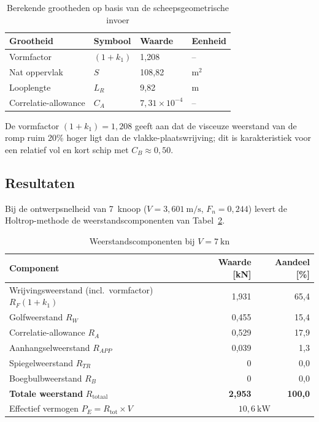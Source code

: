 \begin{table}[H]
\centering
\caption{Berekende grootheden op basis van de scheepsgeometrische invoer
         \cite{spreadsheet_holtrop}}
\label{tab:holtrop_derived}
\begin{tabular}{llll}
\toprule
Grootheid & Symbool & Waarde & Eenheid \\
\midrule
Vormfactor          & $(1+k_1)$    & 1{,}208                & --   \\
Nat oppervlak       & $S$          & 108{,}82               & m$^2$\\
Looplengte          & $L_R$        &   9{,}82               & m    \\
Correlatie-allowance& $C_A$        & $7{,}31 \times 10^{-4}$& --   \\
\bottomrule
\end{tabular}
\end{table}

De vormfactor $(1+k_1) = 1{,}208$ geeft aan dat de visceuze weerstand van de romp
ruim 20\% hoger ligt dan de vlakke-plaatswrijving; dit is karakteristiek voor een
relatief vol en kort schip met $C_B \approx 0{,}50$.

\subsection{Resultaten}
\label{subsec:holtrop-resultaten}

Bij de ontwerpsnelheid van 7~knoop ($V = 3{,}601\ \mathrm{m/s}$, $F_n = 0{,}244$)
levert de Holtrop-methode de weerstandscomponenten van
Tabel~\ref{tab:holtrop_results_7kn}.

\begin{table}[H]
\centering
\caption{Weerstandscomponenten bij $V = 7\ \mathrm{kn}$}
\label{tab:holtrop_results_7kn}
\begin{tabular}{lrr}
\toprule
Component & Waarde [kN] & Aandeel [\%] \\
\midrule
Wrijvingsweerstand (incl.\ vormfactor) $R_F(1+k_1)$ & 1{,}931 & 65{,}4 \\
Golfweerstand $R_W$                                   & 0{,}455 & 15{,}4 \\
Correlatie-allowance $R_A$                            & 0{,}529 & 17{,}9 \\
Aanhangselweerstand $R_{APP}$                         & 0{,}039 &  1{,}3 \\
Spiegelweerstand $R_{TR}$                             & 0       &  0{,}0 \\
Boegbulbweerstand $R_B$                               & 0       &  0{,}0 \\
\midrule
\textbf{Totale weerstand} $R_\mathrm{totaal}$
    & \textbf{2{,}953} & \textbf{100{,}0} \\
\midrule
Effectief vermogen $P_E = R_\mathrm{tot} \times V$
    & \multicolumn{2}{c}{$10{,}6\ \mathrm{kW}$} \\
\bottomrule
\end{tabular}
\end{table}


